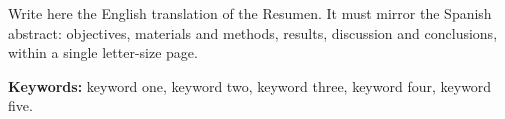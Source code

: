 %
%
%


\begin{otherlanguage}{english}

Write here the English translation of the Resumen. It must mirror the Spanish
abstract: objectives, materials and methods, results, discussion and
conclusions, within a single letter-size page.

\vspace{1em}
\noindent\textbf{Keywords:} keyword one, keyword two, keyword three,
keyword four, keyword five.

\end{otherlanguage}
